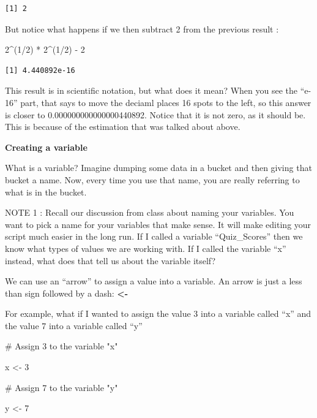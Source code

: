 \documentclass[
  letterpaper,
  DIV=11,
  numbers=noendperiod]{scrreprt}
\newenvironment{Shaded}{\begin{snugshade}}{\end{snugshade}}
\newcommand{\CommentTok}[1]{\textcolor[rgb]{0.37,0.37,0.37}{#1}}
\newcommand{\DecValTok}[1]{\textcolor[rgb]{0.68,0.00,0.00}{#1}}
\newcommand{\NormalTok}[1]{\textcolor[rgb]{0.00,0.23,0.31}{#1}}
\newcommand{\OtherTok}[1]{\textcolor[rgb]{0.00,0.23,0.31}{#1}}
\newcommand{\SpecialCharTok}[1]{\textcolor[rgb]{0.37,0.37,0.37}{#1}}
\begin{document}
\begin{verbatim}
[1] 2
\end{verbatim}

But notice what happens if we then subtract 2 from the previous result :

\begin{Shaded}
\begin{Highlighting}[]
\DecValTok{2}\SpecialCharTok{\^{}}\NormalTok{(}\DecValTok{1}\SpecialCharTok{/}\DecValTok{2}\NormalTok{) }\SpecialCharTok{*} \DecValTok{2}\SpecialCharTok{\^{}}\NormalTok{(}\DecValTok{1}\SpecialCharTok{/}\DecValTok{2}\NormalTok{) }\SpecialCharTok{{-}} \DecValTok{2}
\end{Highlighting}
\end{Shaded}

\begin{verbatim}
[1] 4.440892e-16
\end{verbatim}

This result is in scientific notation, but what does it mean? When you
see the ``e-16'' part, that says to move the deciaml places 16 spots to
the left, so this answer is closer to 0.000000000000000440892. Notice
that it is not zero, as it should be. This is because of the estimation
that was talked about above.

\textbf{Creating a variable}

What is a variable? Imagine dumping some data in a bucket and then
giving that bucket a name. Now, every time you use that name, you are
really referring to what is in the bucket.

NOTE 1 : Recall our discussion from class about naming your variables.
You want to pick a name for your variables that make sense. It will make
editing your script much easier in the long run. If I called a variable
``Quiz\_Scores'' then we know what types of values we are working with.
If I called the variable ``x'' instead, what does that tell us about the
variable itself?

We can use an ``arrow'' to assign a value into a variable. An arrow is
just a less than sign followed by a dash: \textbf{\textless-}

For example, what if I wanted to assign the value 3 into a variable
called ``x'' and the value 7 into a variable called ``y''

\begin{Shaded}
\begin{Highlighting}[]
\CommentTok{\# Assign 3 to the variable "x"}

\NormalTok{x }\OtherTok{\textless{}{-}} \DecValTok{3}

\CommentTok{\# Assign 7 to the variable "y"}

\NormalTok{y }\OtherTok{\textless{}{-}} \DecValTok{7}
\end{Highlighting}
\end{Shaded}
\end{document}
